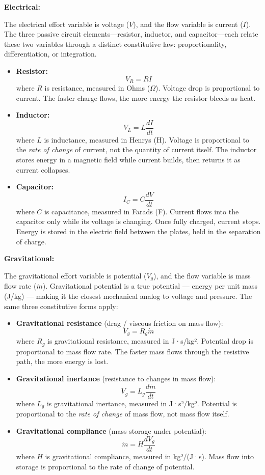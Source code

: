 \documentclass[
  letterpaper,
  DIV=11,
  numbers=noendperiod]{scrartcl}
\begin{document}
\textbf{Electrical:}

The electrical effort variable is voltage (\(V\)), and the flow variable
is current (\(I\)). The three passive circuit elements---resistor,
inductor, and capacitor---each relate these two variables through a
distinct constitutive law: proportionality, differentiation, or
integration.

\begin{itemize}
\item
  \textbf{Resistor:} \[V_R = RI\] where \(R\) is resistance, measured in
  Ohms (\(\Omega\)). Voltage drop is proportional to current. The faster
  charge flows, the more energy the resistor bleeds as heat.
\item
  \textbf{Inductor:} \[V_L = L\frac{dI}{dt}\] where \(L\) is inductance,
  measured in Henrys (H). Voltage is proportional to the \emph{rate of
  change} of current, not the quantity of current itself. The inductor
  stores energy in a magnetic field while current builds, then returns
  it as current collapses.
\item
  \textbf{Capacitor:} \[I_C = C\frac{dV}{dt}\] where \(C\) is
  capacitance, measured in Farads (F). Current flows into the capacitor
  only while its voltage is changing. Once fully charged, current stops.
  Energy is stored in the electric field between the plates, held in the
  separation of charge.
\end{itemize}

\textbf{Gravitational:}

The gravitational effort variable is potential (\(V_g\)), and the flow
variable is mass flow rate (\(\dot{m}\)). Gravitational potential is a
true potential --- energy per unit mass (J/kg) --- making it the closest
mechanical analog to voltage and pressure. The same three constitutive
forms apply:

\begin{itemize}
\item
  \textbf{Gravitational resistance} (drag / viscous friction on mass
  flow): \[V_g = R_g \dot{m}\] where \(R_g\) is gravitational
  resistance, measured in J·s/kg². Potential drop is proportional to
  mass flow rate. The faster mass flows through the resistive path, the
  more energy is lost.
\item
  \textbf{Gravitational inertance} (resistance to changes in mass flow):
  \[V_g = L_g \frac{d\dot{m}}{dt}\] where \(L_g\) is gravitational
  inertance, measured in J·s²/kg². Potential is proportional to the
  \emph{rate of change} of mass flow, not mass flow itself.
\item
  \textbf{Gravitational compliance} (mass storage under potential):
  \[\dot{m} = H \frac{dV_g}{dt}\] where \(H\) is gravitational
  compliance, measured in kg²/(J·s). Mass flow into storage is
  proportional to the rate of change of potential.
\end{itemize}
\end{document}
